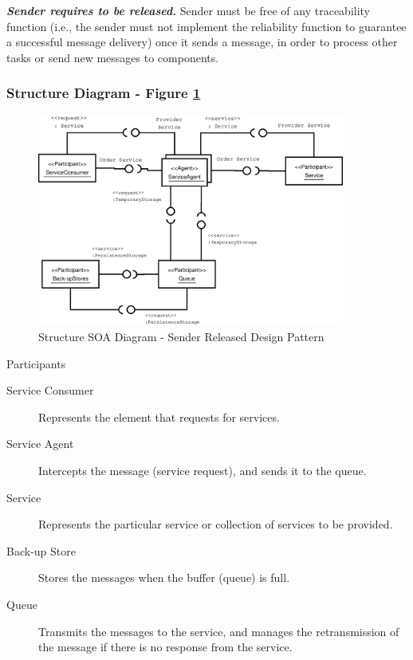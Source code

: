 \noindent\textbf{\textit{Sender requires to be released.  }}Sender must be free of any traceability function (i.e., the sender must not implement the reliability function to guarantee a successful message delivery) once it sends a message, in order to process other tasks or send new messages to components.


\subsubsection{Structure Diagram - Figure \ref{fig:str_diagram_sender}}

\begin{figure}
	\centering
	\includegraphics*[width=0.9\textwidth, keepaspectratio=false]{fig/image14.eps}
	\caption{Structure SOA Diagram - Sender Released Design Pattern}
	\label{fig:str_diagram_sender}
\end{figure}

\begin{description}
	\item[Participants]
\end{description}

\begin{description}
	
	\item[Service Consumer] 
	Represents the element that requests for services.
	
	\item[Service Agent] 
	Intercepts the message (service request), and sends it to the queue.
	
	\item[Service] 
	Represents the particular service or collection of services to be provided.
	
	\item[Back-up Store] 
	Stores the messages when the buffer (queue) is full.
	
	\item[Queue] 
	Transmits the messages to the service, and manages the retransmission of the message if there is no response from the service.
\end{description}

